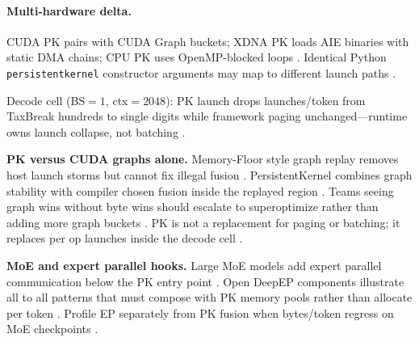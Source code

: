 \paragraph{Multi-hardware delta.} CUDA PK pairs with CUDA Graph buckets; XDNA PK loads AIE binaries with static DMA chains; CPU PK uses OpenMP-blocked loops \citep{nvidia2024cudagraphs,amd2024xdna,amd2024aie,yirage2026,chen2020compilerbasedhardw,patel2025llminference,dlbook,semianalysis2024tma,taxbreak2026,memoryfloor2026,kwon2023vllm,liu2024deepseekv3,dao2022flashattention,dao2023flashdecoding,nvidia2022hopper,dlbook}. Identical Python \texttt{persistentkernel} constructor arguments may map to different launch paths \citep{yirage2026,chen2020compilerbasedhardw,amd2024aie,amd2024xdna,patel2025llminference,dlbook}.

\begin{example}
Decode cell (BS${=}1$, ctx${=}2048$): PK launch drops launches/token from TaxBreak hundreds to single digits while framework paging unchanged---runtime owns launch collapse, not batching \citep{taxbreak2026,yirage2026,kwon2023vllm,patel2025llminference,memoryfloor2026,nvidia2024cudagraphs,chen2020compilerbasedhardw,dao2022flashattention,dlbook}.
\end{example}

\textbf{PK versus CUDA graphs alone.} Memory-Floor style graph replay removes host launch storms but cannot fix illegal fusion \citep{memoryfloor2026,nvidia2024cudagraphs,yirage2026,chen2020compilerbasedhardw,patel2025llminference,dlbook}. PersistentKernel combines graph stability with compiler chosen fusion inside the replayed region \citep{yirage2026,chen2020compilerbasedhardw,nvidia2024cudagraphs,taxbreak2026,memoryfloor2026,patel2025llminference,dlbook}. Teams seeing graph wins without byte wins should escalate to superoptimize rather than adding more graph buckets \citep{memoryfloor2026,taxbreak2026,yirage2026,chen2020compilerbasedhardw,patel2025llminference,kwon2023vllm,dlbook}. PK is not a replacement for paging or batching; it replaces per op launches inside the decode cell \citep{kwon2023vllm,yirage2026,chen2020compilerbasedhardw,patel2025llminference,taxbreak2026,memoryfloor2026,dlbook}.

\textbf{MoE and expert parallel hooks.} Large MoE models add expert parallel communication below the PK entry point \citep{liu2024deepseekv3,patel2025llminference,yirage2026,chen2020compilerbasedhardw,kwon2023vllm,dlbook}. Open DeepEP components illustrate all to all patterns that must compose with PK memory pools rather than allocate per token \citep{liu2024deepseekv3,yirage2026,chen2020compilerbasedhardw,patel2025llminference,dlbook}. Profile EP separately from PK fusion when bytes/token regress on MoE checkpoints \citep{liu2024deepseekv3,patel2025llminference,taxbreak2026,memoryfloor2026,yirage2026,chen2020compilerbasedhardw,kwon2023vllm,dlbook}.

